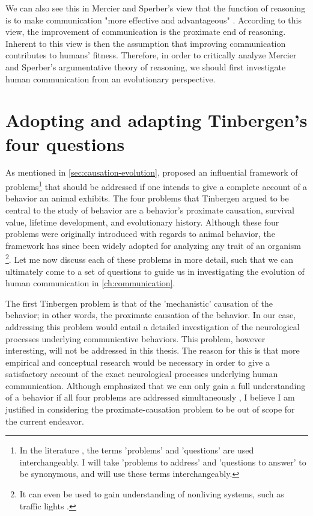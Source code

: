 We can also see this in Mercier and Sperber's view that the function of reasoning is to make communication "more effective and advantageous" \citep[p.~60]{MS11}.
According to this view, the improvement of communication is the proximate end of reasoning. Inherent to this view is then the assumption that improving communication contributes to humans' fitness.
Therefore, in order to critically analyze Mercier and Sperber's argumentative theory of reasoning, we should first investigate human communication from an evolutionary perspective.

\section{Adopting and adapting Tinbergen's four questions}
\label{sec:tinbergen}
As mentioned in \cref{sec:causation-evolution}, \citet{Tinbergen63} proposed an influential framework of problems\footnote{In the literature \citep[e.g.][]{BatesonLaland13}, the terms 'problems' and 'questions' are used interchangeably. I will take 'problems to address' and 'questions to answer' to be synonymous, and will use these terms interchangeably.} that should be addressed if one intends to give a complete account of a behavior an animal exhibits.
The four problems that Tinbergen argued to be central to the study of behavior are a behavior's proximate causation, survival value, lifetime development, and evolutionary history.
Although these four problems were originally introduced with regards to animal behavior, the framework has since been widely adopted for analyzing any trait of an organism \citep{BatesonLaland13}\footnote{It can even be used to gain understanding of nonliving systems, such as traffic lights \citep{BatesonLaland13}.}.
Let me now discuss each of these problems in more detail, such that we can ultimately come to a set of questions to guide us in investigating the evolution of human communication in \cref{ch:communication}.

The first Tinbergen problem is that of the 'mechanistic' causation of the behavior; in other words, the proximate causation of the behavior. In our case, addressing this problem would entail a detailed investigation of the neurological processes underlying communicative behaviors.
This problem, however interesting, will not be addressed in this thesis. The reason for this is that more empirical and conceptual research would be necessary in order to give a satisfactory account of the exact neurological processes underlying human communication. Although \citet{Tinbergen63} emphasized that we can only gain a full understanding of a behavior if all four problems are addressed simultaneously \citep[see also][]{BatesonLaland13}, I believe I am justified in considering the proximate-causation problem to be out of scope for the current endeavor.

